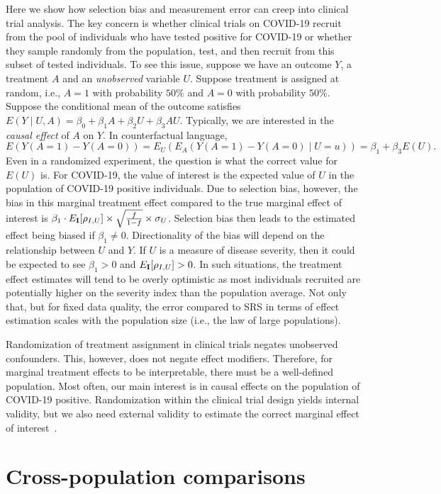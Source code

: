 \documentclass[12pt]{article}
\def\I{{\bf I}}
\begin{document}
Here we show how selection bias and measurement error can creep into clinical trial analysis. The key concern is whether clinical trials on COVID-19 recruit from the pool of individuals who have tested positive for COVID-19 or whether they sample randomly from the population, test, and then recruit from this subset of tested individuals.  To see this issue, suppose we have an outcome $Y$, a treatment $A$ and an \emph{unobserved} variable $U$.  Suppose treatment is assigned at random, i.e., $A =1$ with probability $50\%$ and $A=0$ with probability $50\%$.  Suppose the conditional mean of the outcome satisfies  $E(Y \mid U, A ) = \beta_0 + \beta_1 A + \beta_2 U + \beta_3 A U$.  Typically, we are interested in the \emph{causal effect} of $A$ on $Y$.  In counterfactual language,
$$
E( Y(A=1) - Y(A=0) ) = E_U ( E_A ( Y(A=1) - Y(A=0) \mid U=u ))
= \beta_1 + \beta_3 E(U).
$$
Even in a randomized experiment, the question is what the correct value for $E(U)$ is. For COVID-19, the value of interest is the expected value of $U$ in the population of COVID-19 positive individuals.  Due to selection bias, however, the bias in this marginal treatment effect compared to the true marginal effect of interest is $\beta_1 \cdot E_{\I} [ \rho_{I,U} ] \times \sqrt{ \frac{f}{1-f} } \times \sigma_U$.  Selection bias then leads to the estimated effect being biased if $\beta_1 \neq 0$.  Directionality of the bias will depend on the relationship between $U$ and $Y$.  If $U$ is a measure of disease severity, then it could be expected to see $\beta_1 > 0$ and $E_{\I} [ \rho_{I, U} ] >0$.  In such situations, the treatment effect estimates will tend to be overly optimistic as most individuals recruited are potentially higher on the severity index than the population average.  Not only that, but for fixed data quality, the error compared to SRS in terms of effect estimation scales with the population size (i.e., the law of large populations).

Randomization of treatment assignment in clinical trials negates unobserved confounders.  This, however, does not negate effect modifiers.  Therefore, for marginal treatment effects to be interpretable, there must be a well-defined population.  Most often, our main interest is in causal effects on the population of COVID-19 positive.  Randomization within the clinical trial design yields internal validity, but we also need external validity to estimate the correct marginal effect of interest~\cite{Keiding2016}.

\section*{Cross-population comparisons}
\end{document}
